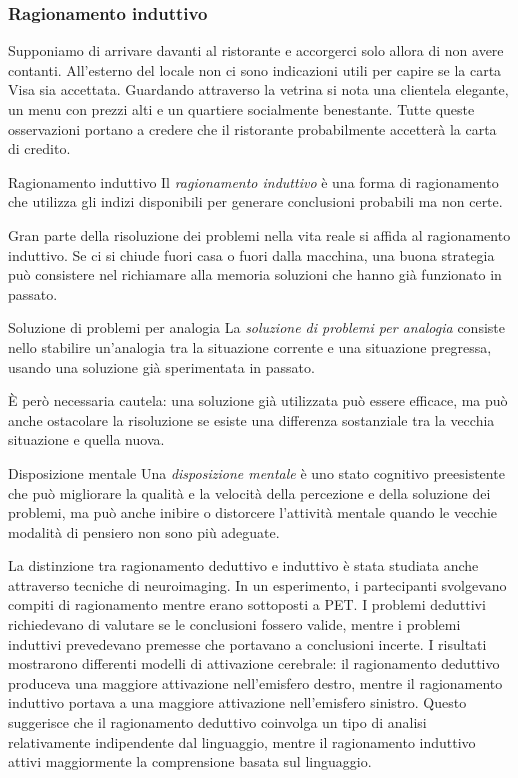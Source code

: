 \documentclass[a4paper]{article}
\begin{document}
\subsubsection{Ragionamento induttivo}
Supponiamo di arrivare davanti al ristorante e accorgerci solo allora di non avere contanti. All'esterno del locale non ci sono indicazioni utili per capire se la carta Visa sia accettata. Guardando attraverso la vetrina si nota una clientela elegante, un menu con prezzi alti e un quartiere socialmente benestante. Tutte queste osservazioni portano a credere che il ristorante probabilmente accetterà la carta di credito.
\begin{snippetdefinition}{Ragionamento induttivo}
    Il \emph{ragionamento induttivo} è una forma di ragionamento che utilizza gli indizi disponibili per generare conclusioni probabili ma non certe.
\end{snippetdefinition}
Gran parte della risoluzione dei problemi nella vita reale si affida al ragionamento induttivo. Se ci si chiude fuori casa o fuori dalla macchina, una buona strategia può consistere nel richiamare alla memoria soluzioni che hanno già funzionato in passato.
\begin{snippetdefinition}{Soluzione di problemi per analogia}
    La \emph{soluzione di problemi per analogia} consiste nello stabilire un'analogia tra la situazione corrente e una situazione pregressa, usando una soluzione già sperimentata in passato.
\end{snippetdefinition}
È però necessaria cautela: una soluzione già utilizzata può essere efficace, ma può anche ostacolare la risoluzione se esiste una differenza sostanziale tra la vecchia situazione e quella nuova.
\begin{snippetdefinition}{Disposizione mentale}
    Una \emph{disposizione mentale} è uno stato cognitivo preesistente che può migliorare la qualità e la velocità della percezione e della soluzione dei problemi, ma può anche inibire o distorcere l'attività mentale quando le vecchie modalità di pensiero non sono più adeguate.
\end{snippetdefinition}
La distinzione tra ragionamento deduttivo e induttivo è stata studiata anche attraverso tecniche di neuroimaging. In un esperimento, i partecipanti svolgevano compiti di ragionamento mentre erano sottoposti a PET. I problemi deduttivi richiedevano di valutare se le conclusioni fossero valide, mentre i problemi induttivi prevedevano premesse che portavano a conclusioni incerte.
I risultati mostrarono differenti modelli di attivazione cerebrale: il ragionamento deduttivo produceva una maggiore attivazione nell'emisfero destro, mentre il ragionamento induttivo portava a una maggiore attivazione nell'emisfero sinistro. Questo suggerisce che il ragionamento deduttivo coinvolga un tipo di analisi relativamente indipendente dal linguaggio, mentre il ragionamento induttivo attivi maggiormente la comprensione basata sul linguaggio.
\end{document}

